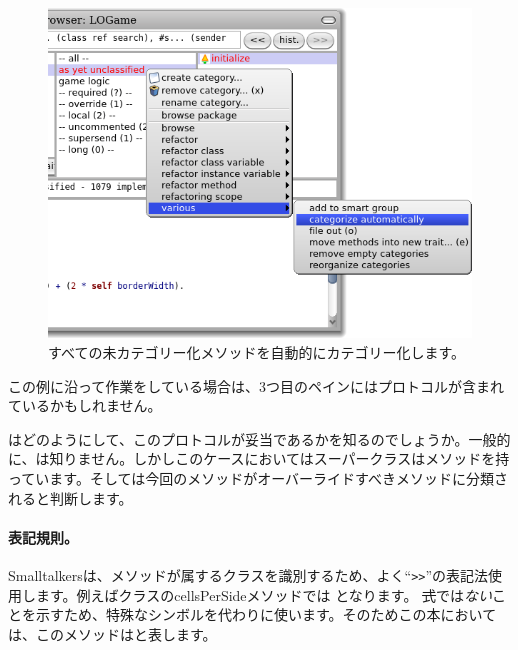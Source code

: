 \documentclass[a4paper,10pt,twoside]{book}
\begin{document}
\begin{figure}[htbp]
   \centering
   \includegraphics[width=\textwidth]{Categorize} 
   \caption{すべての未カテゴリー化メソッドを自動的にカテゴリー化します。}
\end{figure}

この例に沿って作業をしている場合は、3つ目のペインにはプロトコルが含まれているかもしれません。

\pharo はどのようにして、このプロトコルが妥当であるかを知るのでしょうか。一般的に、\pharo は知りません。しかしこのケースにおいてはスーパークラスはメソッドを持っています。そして\pharo は今回のメソッドがオーバーライドすべきメソッドに分類されると判断します。


\paragraph{表記規則。} Smalltalkersは、メソッドが属するクラスを識別するため、よく``\verb|>>|''の表記法使用します。例えばクラスのcellsPerSideメソッドでは となります。
\st 式では\emph{ない}ことを示すため、特殊なシンボル\ct{>>>}を代わりに使います。そのためこの本においては、このメソッドはと表します。
\end{document}
